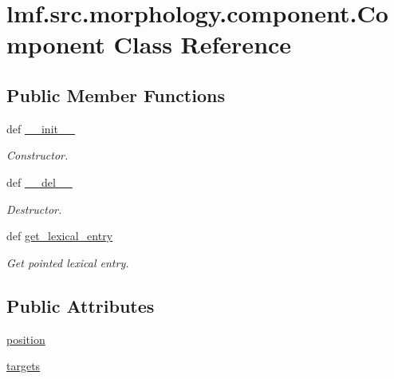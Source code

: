 \hypertarget{classlmf_1_1src_1_1morphology_1_1component_1_1_component}{\section{lmf.\+src.\+morphology.\+component.\+Component Class Reference}
\label{classlmf_1_1src_1_1morphology_1_1component_1_1_component}
}
\subsection*{Public Member Functions}
\begin{DoxyCompactItemize}
\item 
def \hyperlink{classlmf_1_1src_1_1morphology_1_1component_1_1_component_ae5d54b8fa8350b799ebbf914ef528dd7}{\+\_\+\+\_\+init\+\_\+\+\_\+}
\begin{DoxyCompactList}\small\item\em Constructor. \end{DoxyCompactList}\item 
def \hyperlink{classlmf_1_1src_1_1morphology_1_1component_1_1_component_aa9c51c8d6a9f03f3e36f8b417a8f2f1e}{\+\_\+\+\_\+del\+\_\+\+\_\+}
\begin{DoxyCompactList}\small\item\em Destructor. \end{DoxyCompactList}\item 
def \hyperlink{classlmf_1_1src_1_1morphology_1_1component_1_1_component_adbe6d9c8fc9cdbf9dd0a6b5c07a3afd7}{get\+\_\+lexical\+\_\+entry}
\begin{DoxyCompactList}\small\item\em Get pointed lexical entry. \end{DoxyCompactList}\end{DoxyCompactItemize}
\subsection*{Public Attributes}
\begin{DoxyCompactItemize}
\item 
\hyperlink{classlmf_1_1src_1_1morphology_1_1component_1_1_component_ad4f8453c7d8bd58fe8d364b363067b2a}{position}
\item 
\hyperlink{classlmf_1_1src_1_1morphology_1_1component_1_1_component_a90de1db1e2438bbbcd08cccbe07ad1ea}{targets}
\end{DoxyCompactItemize}


